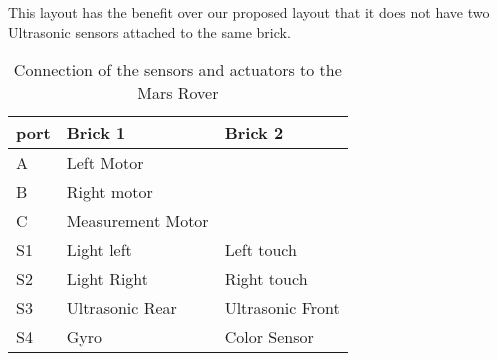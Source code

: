 This layout has the benefit over our proposed layout that it does not have two 
Ultrasonic sensors attached to the same brick.

\begin{table}[H]
	\centering
	\begin{tabular}{|l|l|l|}
		\hline
		port	& Brick 1 & Brick 2\\  \hline
		\hline
		A 		& Left Motor & \\  
		B		& Right motor & \\  
		C		& Measurement Motor & \\  
		\hline
		S1	 	& Light left & Left touch \\  
		S2		& Light Right & Right touch \\  
		S3		& Ultrasonic Rear & Ultrasonic Front\\  
		S4		& Gyro & Color Sensor \\  
		\hline
	\end{tabular}
\caption{Connection of the sensors and actuators to the Mars Rover}
\label{tbl:finallayout}
\end{table}